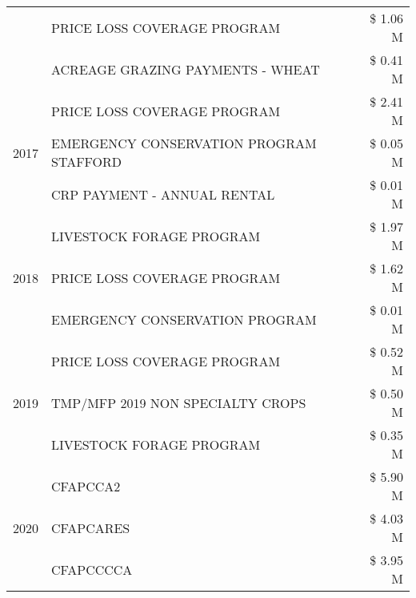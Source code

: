 \begin{tabular}{llr}
 & PRICE LOSS COVERAGE PROGRAM & \$ 1.06 M \\
 & ACREAGE GRAZING PAYMENTS - WHEAT & \$ 0.41 M \\
\cline{1-3}
\multirow[t]{3}{*}{2017} & PRICE LOSS COVERAGE PROGRAM & \$ 2.41 M \\
 & EMERGENCY CONSERVATION PROGRAM STAFFORD & \$ 0.05 M \\
 & CRP PAYMENT - ANNUAL RENTAL & \$ 0.01 M \\
\cline{1-3}
\multirow[t]{3}{*}{2018} & LIVESTOCK FORAGE PROGRAM & \$ 1.97 M \\
 & PRICE LOSS COVERAGE PROGRAM & \$ 1.62 M \\
 & EMERGENCY CONSERVATION PROGRAM & \$ 0.01 M \\
\cline{1-3}
\multirow[t]{3}{*}{2019} & PRICE LOSS COVERAGE PROGRAM & \$ 0.52 M \\
 & TMP/MFP 2019 NON SPECIALTY CROPS & \$ 0.50 M \\
 & LIVESTOCK FORAGE PROGRAM & \$ 0.35 M \\
\cline{1-3}
\multirow[t]{3}{*}{2020} & CFAPCCA2 & \$ 5.90 M \\
 & CFAPCARES & \$ 4.03 M \\
 & CFAPCCCCA & \$ 3.95 M \\
\cline{1-3}
\bottomrule
\end{tabular}
